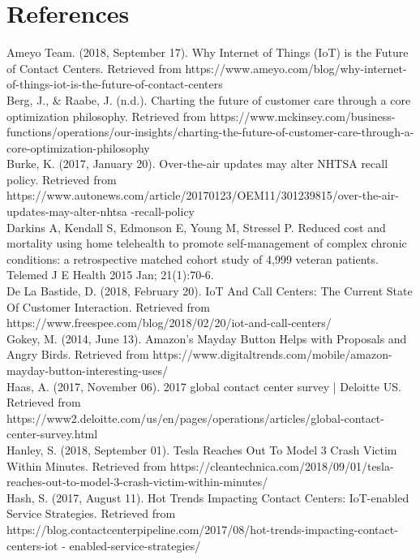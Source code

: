\documentclass[11pt]{article}
\begin{document}
\newpage
\section*{References}
Ameyo Team. (2018, September 17). Why Internet of Things (IoT) is the Future of Contact Centers. Retrieved from https://www.ameyo.com/blog/why-internet-of-things-iot-is-the-future-of-contact-centers \\

Berg, J., \& Raabe, J. (n.d.). Charting the future of customer care through a core optimization philosophy. Retrieved from https://www.mckinsey.com/business-functions/operations/our-insights/charting-the-future-of-customer-care-through-a-core-optimization-philosophy \\

Burke, K. (2017, January 20). Over-the-air updates may alter NHTSA recall policy. Retrieved from https://www.autonews.com/article/20170123/OEM11/301239815/over-the-air-updates-may-alter-nhtsa -recall-policy \\

Darkins A, Kendall S, Edmonson E, Young M, Stressel P. Reduced cost and mortality using home telehealth to promote self-management of complex chronic conditions: a retrospective matched cohort study of 4,999 veteran patients. Telemed J E Health 2015 Jan; 21(1):70-6.\\

De La Bastide, D. (2018, February 20). IoT And Call Centers: The Current State Of Customer Interaction. Retrieved from https://www.freespee.com/blog/2018/02/20/iot-and-call-centers/ \\

Gokey, M. (2014, June 13). Amazon's Mayday Button Helps with Proposals and Angry Birds. Retrieved from https://www.digitaltrends.com/mobile/amazon-mayday-button-interesting-uses/ \\

Haas, A. (2017, November 06). 2017 global contact center survey | Deloitte US. Retrieved from https://www2.deloitte.com/us/en/pages/operations/articles/global-contact-center-survey.html \\

Hanley, S. (2018, September 01). Tesla Reaches Out To Model 3 Crash Victim Within Minutes. Retrieved from https://cleantechnica.com/2018/09/01/tesla-reaches-out-to-model-3-crash-victim-within-minutes/ \\

Hash, S. (2017, August 11). Hot Trends Impacting Contact Centers: IoT-enabled Service Strategies. Retrieved from https://blog.contactcenterpipeline.com/2017/08/hot-trends-impacting-contact-centers-iot - enabled-service-strategies/ \\
\end{document}

